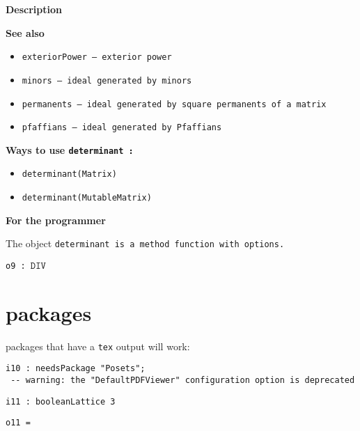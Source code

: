 \documentclass[12pt,a4paper]{amsart}
\begin{document}
\par \medskip\noindent\begingroup\Large\bf
Description\endgroup
\par \smallskip%

\par \medskip\noindent\begingroup\Large\bf
See also\endgroup
\par \smallskip%
\begin{itemize}
\item \begingroup\tt exteriorPower\endgroup{} -- exterior power
\item \begingroup\tt minors\endgroup{} -- ideal generated by minors
\item \begingroup\tt permanents\endgroup{} -- ideal generated by square permanents of a matrix
\item \begingroup\tt pfaffians\endgroup{} -- ideal generated by Pfaffians
\end{itemize}

\par \medskip\noindent\begingroup\Large\bf
Ways to use \begingroup\tt determinant\endgroup{} :\endgroup
\par \smallskip%
\begin{itemize}
\item \begingroup\tt {}determinant(Matrix){}\endgroup{}
\item \begingroup\tt {}determinant(MutableMatrix){}\endgroup{}
\end{itemize}

\par \medskip\noindent\begingroup\Large\bf
For the programmer\endgroup
\par \smallskip%

\par The object \begingroup\tt determinant\endgroup{} is a \begingroup\tt method\ function\ with\ options\endgroup{}.

\noindent\verb|o9 : |$\texttt{DIV}$
\smallskip


\section{packages}
packages that have a {\tt tex} output will work:
\smallskip
\begin{verbatim}
i10 : needsPackage "Posets";
 -- warning: the "DefaultPDFViewer" configuration option is deprecated
\end{verbatim}
\begin{verbatim}
i11 : booleanLattice 3
\end{verbatim}
\noindent\verb|o11 = |
\end{document}
